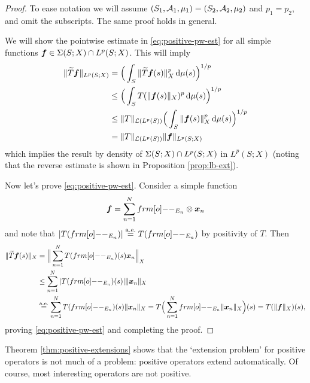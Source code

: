 \begin{proof}
  To ease notation we will assume $(S_1, \mathcal{A}_1, \mu_1) = (S_2, \mathcal{A}_2, \mu_2)$ and $p_1 = p_2$, and omit the subscripts. The same proof holds in general.
  
  We will show the pointwise estimate in \eqref{eq:positive-pw-est} for all simple functions $\bm{f} \in \Sigma(S;X) \cap L^{p}(S;X)$.
  This will imply
  \begin{equation*}
    \begin{aligned}
      \|\widetilde{T}\bm{f}\|_{L^{p}(S;X)} &= \Big( \int_{S} \|\widetilde{T}\bm{f}(s)\|_X^{p} \, \mathrm{d}\mu(s) \Big)^{1/p} \\
      &\leq \Big( \int_{S} T(\|\bm{f}(s)\|_X)^{p} \, \mathrm{d}\mu(s) \Big)^{1/p}\\
      &\leq \|T\|_{\mathcal{L}(L^{p}(S))} \Big( \int_{S} \|\bm{f}(s)\|_X^{p} \, \mathrm{d}\mu(s) \Big)^{1/p} \\
      &= \|T\|_{\mathcal{L}(L^{p}(S))} \|\bm{f}\|_{L^{p}(S;X)}
    \end{aligned}
  \end{equation*}
  which implies the result by density of $\Sigma(S;X) \cap L^{p}(S;X)$ in $L^{p}(S;X)$ (noting that the reverse estimate is shown in Proposition \ref{prop:lb-ext}).

  Now let's prove \eqref{eq:positive-pw-est}.
  Consider a simple function
  \begin{equation*}
    \mb{f} = \sum_{n=1}^N \1_{E_n} \otimes \mb{x}_n
  \end{equation*}
  and note that $|T(\1_{E_n})| \aeeq T(\1_{E_n})$ by positivity of $T$.
  Then
  \begin{equation*}
    \begin{aligned}
      \|\td{T}\mb{f}(s)\|_X &= \Big\| \sum_{n=1}^N T(\1_{E_n})(s) \mb{x}_n \Big\|_X \\
      &\leq \sum_{n=1}^N |T(\1_{E_n})(s)| \|\mb{x}_n\|_X \\
      &\aeeq \sum_{n=1}^N T(\1_{E_n})(s) \|\mb{x}_n\|_X 
      = T\Big( \sum_{n=1}^N \1_{E_n} \|\mb{x}_n\|_X \Big)(s) 
      = T(\|\mb{f}\|_X)(s),
    \end{aligned}
  \end{equation*}
  proving \eqref{eq:positive-pw-est} and completing the proof.
\end{proof}

Theorem \ref{thm:positive-extensions} shows that the `extension problem' for positive operators is not much of a problem: positive operators extend automatically.
Of course, most interesting operators are not positive.

